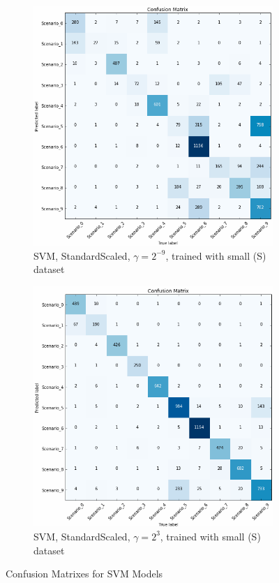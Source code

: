 \begin{figure}[!htb]
    \captionsetup[subfigure]{justification=centering}
    \centering
    \begin{subfigure}[htb]{0.49\textwidth}
        \centering
        \includegraphics[width=\linewidth]{figures/svc_scaled_S_1}
        \caption{\ac{SVM}, StandardScaled, \(\gamma=2^{-9}\), trained with small (S) dataset}
        \label{fig:knn_2}
    \end{subfigure}
    \begin{subfigure}[htb]{0.49\textwidth}
        \centering
        \includegraphics[width=\linewidth]{figures/svc_scaled_S_1e6}
        \caption{\ac{SVM}, StandardScaled, \(\gamma=2^3\), trained with small (S) dataset}
        \label{fig:knn_4}
    \end{subfigure}
    \caption{Confusion Matrixes for \ac{SVM} Models}
    \label{fig:confusionsvc}
\end{figure}
